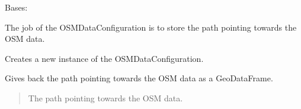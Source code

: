 \documentclass[letterpaper,10pt,english]{sphinxmanual}
\begin{document}
\begin{fulllineitems}
\label{\detokenize{apidoc/src.osm_configurator.model.project.configuration:src.osm_configurator.model.project.configuration.osm_data_configuration.OSMDataConfiguration}}
\pysigstartsignatures
{}
\pysigstopsignatures
\sphinxAtStartPar
Bases: 

\sphinxAtStartPar
The job of the OSMDataConfiguration is to store the path pointing towards the OSM data.

\begin{fulllineitems}
\label{\detokenize{apidoc/src.osm_configurator.model.project.configuration:src.osm_configurator.model.project.configuration.osm_data_configuration.OSMDataConfiguration.__init__}}
\pysigstartsignatures
{}
\pysigstopsignatures
\sphinxAtStartPar
Creates a new instance of the OSMDataConfiguration.

\end{fulllineitems}


\begin{fulllineitems}
\label{\detokenize{apidoc/src.osm_configurator.model.project.configuration:src.osm_configurator.model.project.configuration.osm_data_configuration.OSMDataConfiguration.get_osm_data}}
\pysigstartsignatures
{}
\pysigstopsignatures
\sphinxAtStartPar
Gives back the path pointing towards the OSM data as a GeoDataFrame.
\begin{quote}\begin{description}
\sphinxAtStartPar
The path pointing towards the OSM data.

\sphinxAtStartPar
{}

\end{description}\end{quote}


\end{fulllineitems}
\end{fulllineitems}
\end{document}

